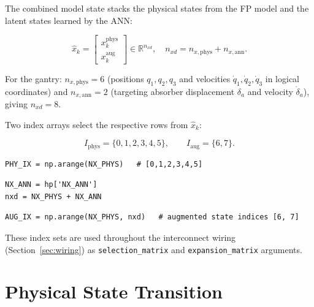 \documentclass[11pt,a4paper]{article}
\newcommand{\code}[1]{\texttt{#1}}
\newcommand{\codetitle}[2]{\small\texttt{#1}\quad lines #2}
\begin{document}
The combined model state stacks the physical states from the FP model
and the latent states learned by the ANN:

\begin{equation}
  \hat{x}_k =
  \begin{bmatrix} x_k^{\mathrm{phys}} \\ x_k^{\mathrm{aug}} \end{bmatrix}
  \in \mathbb{R}^{n_{xd}}, \quad
  n_{xd} = n_{x,\mathrm{phys}} + n_{x,\mathrm{ann}}.
  \label{eq:state_partition}
\end{equation}

For the gantry: $n_{x,\mathrm{phys}} = 6$ (positions $q_1, q_2, q_3$ and
velocities $\dot{q}_1, \dot{q}_2, \dot{q}_3$ in logical coordinates) and
$n_{x,\mathrm{ann}} = 2$ (targeting absorber displacement $\delta_a$ and
velocity $\dot{\delta}_a$), giving $n_{xd} = 8$.

Two index arrays select the respective rows from $\hat{x}_k$:

\begin{equation}
  I_{\mathrm{phys}} = \{0,1,2,3,4,5\}, \qquad
  I_{\mathrm{aug}}  = \{6,7\}.
  \label{eq:index_sets}
\end{equation}

\begin{lstlisting}[style=py,
  title={\codetitle{gantry\_interconnect\_dynamic.py}{190, 219--220, 251}},
  firstnumber=190]
PHY_IX = np.arange(NX_PHYS)   # [0,1,2,3,4,5]
\end{lstlisting}

\begin{lstlisting}[style=py,
  title={\codetitle{gantry\_interconnect\_dynamic.py}{219--220, 251}},
  firstnumber=219]
NX_ANN = hp['NX_ANN']
nxd = NX_PHYS + NX_ANN
\end{lstlisting}

\begin{lstlisting}[style=py,
  title={\codetitle{gantry\_interconnect\_dynamic.py}{251}},
  firstnumber=251]
AUG_IX = np.arange(NX_PHYS, nxd)   # augmented state indices [6, 7]
\end{lstlisting}

These index sets are used throughout the interconnect wiring
(Section~\ref{sec:wiring}) as \code{selection\_matrix} and
\code{expansion\_matrix} arguments.

\section{Physical State Transition}
\label{sec:phys}
\end{document}

